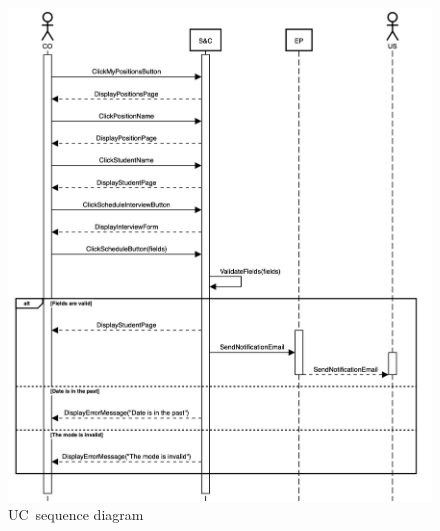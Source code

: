 \begin{figure}
    \centering
    \includegraphics[width=16cm]{images/sequence-diagrams/company-schedules-interview.png}
    \caption{UC\theuc\ sequence diagram}
\end{figure}


\clearpage

